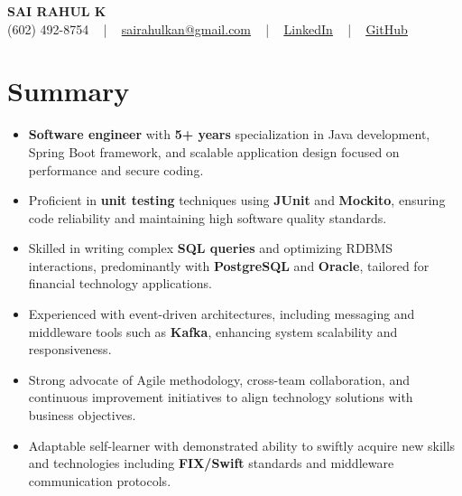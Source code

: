 \documentclass[letterpaper,11pt]{article}
\newcommand{\resumeItem}[1]{
  \item\footnotesize{
    {#1 \vspace{-2pt}}
  }
}
\newcommand{\resumeItemListStart}{\begin{itemize}[leftmargin=*]}
\newcommand{\resumeItemListEnd}{\end{itemize}\vspace{-5pt}}
\begin{document}
\begin{center}
    {\fontsize{14pt}{12pt}\selectfont \textbf{\MakeUppercase{Sai Rahul K}}}\\ \vspace{2pt}
    \fontsize{10pt}{12pt}\selectfont (602) 492-8754 ~ | ~ \href{mailto:sairahulkan@gmail.com}{sairahulkan@gmail.com} ~ | ~
    \href{https://www.linkedin.com/in/rq123/}{\color{blue}\underline{LinkedIn}} ~ | ~
    \href{https://github.com/kanrahuldo}{\color{blue}\underline{GitHub}}~
    \vspace{-8pt}
\end{center}

\section{Summary}
\fontsize{9pt}{10pt}\selectfont
\resumeItemListStart
    \resumeItem{\textbf{Software engineer} with \textbf{5+ years} specialization in Java development, Spring Boot framework, and scalable application design focused on performance and secure coding.} \vspace{-3pt}
    \resumeItem{Proficient in \textbf{unit testing} techniques using \textbf{JUnit} and \textbf{Mockito}, ensuring code reliability and maintaining high software quality standards.} \vspace{-3pt}
    \resumeItem{Skilled in writing complex \textbf{SQL queries} and optimizing RDBMS interactions, predominantly with \textbf{PostgreSQL} and \textbf{Oracle}, tailored for financial technology applications.} \vspace{-3pt}
    \resumeItem{Experienced with event-driven architectures, including messaging and middleware tools such as \textbf{Kafka}, enhancing system scalability and responsiveness.} \vspace{-3pt}
    \resumeItem{Strong advocate of Agile methodology, cross-team collaboration, and continuous improvement initiatives to align technology solutions with business objectives.} \vspace{-3pt}
    \resumeItem{Adaptable self-learner with demonstrated ability to swiftly acquire new skills and technologies including \textbf{FIX/Swift} standards and middleware communication protocols.} \vspace{-3pt}
\resumeItemListEnd
\vspace{-6pt}
\end{document}
